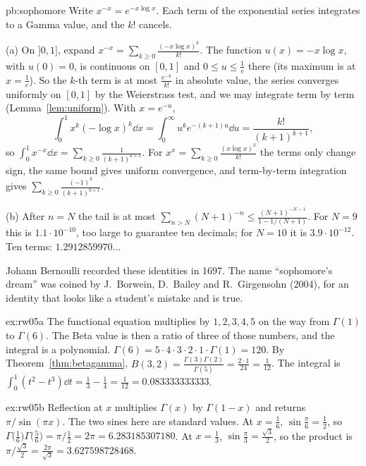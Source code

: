 \begin{solution}{pb:sophomore}
\idea Write $x^{-x}=e^{-x\log x}$. Each term of the exponential series integrates to a Gamma value, and the $k!$ cancels.

\writeup (a) On $]0,1]$, expand $x^{-x}=\sum_{k\ge0}\frac{(-x\log x)^k}{k!}$. The function $u(x)=-x\log x$, with $u(0)=0$, is continuous on $[0,1]$ and $0\le u\le\frac1e$ there (its
maximum is at $x=\frac1e$). So the $k$-th term is at most $\frac{e^{-k}}{k!}$ in absolute value, the series converges uniformly
on $[0,1]$ by the Weierstrass test, and we may integrate term by term (Lemma~\ref{lem:uniform}). With $x=e^{-u}$,
\[
\int_0^1x^k(-\log x)^k\dd x=\int_0^\infty u^ke^{-(k+1)u}\dd u=\frac{k!}{(k+1)^{k+1}},
\]
so $\int_0^1x^{-x}\dd x=\sum_{k\ge0}\frac1{(k+1)^{k+1}}$. For $x^x=\sum_{k\ge0}\frac{(x\log x)^k}{k!}$ the terms only change sign, the same bound gives uniform convergence, and term-by-term integration gives $\sum_{k\ge0}\frac{(-1)^k}{(k+1)^{k+1}}$.

(b) After $n=N$ the tail is at most $\sum_{n>N}(N+1)^{-n}\le\frac{(N+1)^{-N-1}}{1-1/(N+1)}$. For $N=9$ this is $1.1\cdot10^{-10}$, too large to guarantee ten
decimals; for $N=10$ it is $3.9\cdot10^{-12}$. Ten terms: $1.2912859970\ldots$

\leads Johann Bernoulli recorded these identities in 1697. The name ``sophomore's dream'' was coined by J.~Borwein, D.~Bailey and
R.~Girgensohn (2004), for an identity that looks like a student's mistake and is true.
\end{solution}

\begin{solution}{ex:rw05a}
\idea The functional equation multiplies by $1,2,3,4,5$ on the way from $\Gamma(1)$ to $\Gamma(6)$. The Beta value is then a ratio of three of those numbers, and the integral is a polynomial.
\writeup $\Gamma(6)=5\cdot4\cdot3\cdot2\cdot1\cdot\Gamma(1)=120$. By Theorem~\ref{thm:betagamma}, $B(3,2)=\frac{\Gamma(3)\Gamma(2)}{\Gamma(5)}=\frac{2\cdot1}{24}=\frac1{12}$. The integral is $\int_0^1(t^2-t^3)\dd t=\frac13-\frac14=\frac1{12}=0.083333333333$.
\end{solution}

\begin{solution}{ex:rw05b}
\idea Reflection at $x$ multiplies $\Gamma(x)$ by $\Gamma(1-x)$ and returns $\pi/\sin(\pi x)$. The two sines here are standard values.
\writeup At $x=\frac16$, $\sin\frac\pi6=\frac12$, so $\Gamma\bigl(\frac16\bigr)\Gamma\bigl(\frac56\bigr)=\pi\big/\frac12=2\pi=6.283185307180$. At $x=\frac13$, $\sin\frac\pi3=\frac{\sqrt3}2$, so the product is $\pi\big/\frac{\sqrt3}2=\frac{2\pi}{\sqrt3}=3.627598728468$.
\end{solution}


